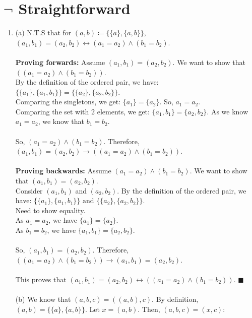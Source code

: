 \documentclass[a4paper]{article}
\begin{document}
\section{$\neg$ Straightforward}
\begin{enumerate}
    \item (a) N.T.S that for $(a, b) \coloneqq \{\{a\}, \{a, b\}\}$, $(a_1, b_1) = (a_2, b_2) \leftrightarrow (a_1 = a_2) \land (b_1 = b_2)$.\\
    \\
    \textbf{Proving forwards:} Assume $(a_1, b_1) = (a_2, b_2)$. We want to show that $((a_1 = a_2) \land (b_1 = b_2))$.\\
    By the definition of the ordered pair, we have: $\{\{a_1\}, \{a_1, b_1\}\} = \{\{a_2\}, \{a_2, b_2\}\}$.\\
    Comparing the singletons, we get:
    $\{a_1\} = \{a_2\}$. So, $a_1 = a_2$.\\
    Comparing the set with 2 elements, we get:
    $\{a_1, b_1\} = \{a_2, b_2\}$. As we know $a_1 = a_2$, we know that $b_1 = b_2$.\\
    \\
    So, $(a_1 = a_2) \land (b_1 = b_2)$. Therefore, $(a_1, b_1) = (a_2, b_2) \rightarrow ((a_1 = a_2) \land (b_1 = b_2))$.\\
    \\
    \textbf{Proving backwards:} Assume $(a_1 = a_2) \land (b_1 = b_2)$. We want to show that $(a_1, b_1) = (a_2, b_2)$.\\
    Consider $(a_1, b_1)$ and $(a_2, b_2)$. By the definition of the ordered pair, we have: $\{\{a_1\}, \{a_1, b_1\}\} \text{ and } \{\{a_2\}, \{a_2, b_2\}\}$.\\
    Need to show equality.
    \\
    As $a_1 = a_2$, we have $\{a_1\} = \{a_2\}$.\\
    As $b_1 = b_2$, we have $\{a_1, b_1\} = \{a_2, b_2\}$.\\
    \\
    So, $(a_1, b_1) = (a_2, b_2)$. Therefore, $((a_1 = a_2) \land (b_1 = b_2)) \rightarrow (a_1, b_1) = (a_2, b_2)$.\\
    \\
    This proves that $(a_1, b_1) = (a_2, b_2) \leftrightarrow ((a_1 = a_2) \land (b_1 = b_2))$. $\blacksquare$\\
    \\
(b) We know that $(a, b, c) = ((a, b), c)$. By definition, $(a, b) = \{\{a\}, \{a, b\}\}$. Let $x = (a, b)$. Then, $(a, b, c) = (x, c)$:

\end{enumerate}
\end{document}
